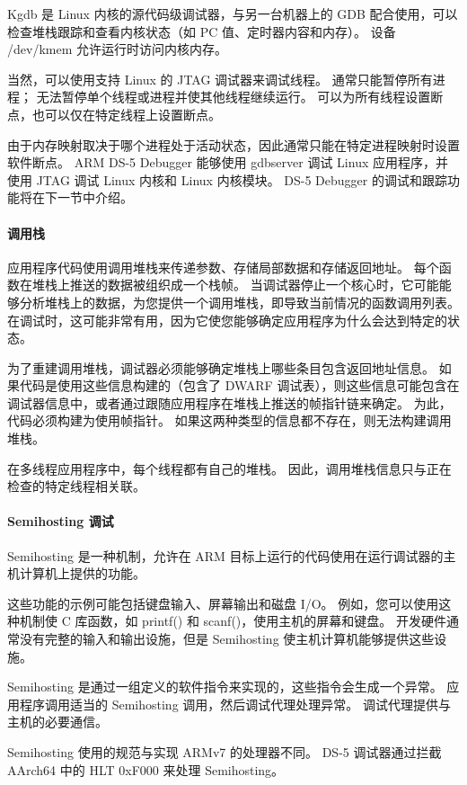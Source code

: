 Kgdb 是 Linux 内核的源代码级调试器，与另一台机器上的 GDB 配合使用，可以检查堆栈跟踪和查看内核状态（如 PC 值、定时器内容和内存）。
设备 /dev/kmem 允许运行时访问内核内存。

当然，可以使用支持 Linux 的 JTAG 调试器来调试线程。
通常只能暂停所有进程；
无法暂停单个线程或进程并使其他线程继续运行。
可以为所有线程设置断点，也可以仅在特定线程上设置断点。

由于内存映射取决于哪个进程处于活动状态，因此通常只能在特定进程映射时设置软件断点。
ARM DS-5 Debugger 能够使用 gdbserver 调试 Linux 应用程序，并使用 JTAG 调试 Linux 内核和 Linux 内核模块。
DS-5 Debugger 的调试和跟踪功能将在下一节中介绍。

\paragraph*{调用栈}

应用程序代码使用调用堆栈来传递参数、存储局部数据和存储返回地址。
每个函数在堆栈上推送的数据被组织成一个栈帧。
当调试器停止一个核心时，它可能能够分析堆栈上的数据，为您提供一个调用堆栈，即导致当前情况的函数调用列表。
在调试时，这可能非常有用，因为它使您能够确定应用程序为什么会达到特定的状态。

为了重建调用堆栈，调试器必须能够确定堆栈上哪些条目包含返回地址信息。
如果代码是使用这些信息构建的（包含了 DWARF 调试表），则这些信息可能包含在调试器信息中，或者通过跟随应用程序在堆栈上推送的帧指针链来确定。
为此，代码必须构建为使用帧指针。
如果这两种类型的信息都不存在，则无法构建调用堆栈。

在多线程应用程序中，每个线程都有自己的堆栈。
因此，调用堆栈信息只与正在检查的特定线程相关联。

\paragraph*{Semihosting 调试}

Semihosting 是一种机制，允许在 ARM 目标上运行的代码使用在运行调试器的主机计算机上提供的功能。

这些功能的示例可能包括键盘输入、屏幕输出和磁盘 I/O。
例如，您可以使用这种机制使 C 库函数，如 printf() 和 scanf()，使用主机的屏幕和键盘。
开发硬件通常没有完整的输入和输出设施，但是 Semihosting 使主机计算机能够提供这些设施。

Semihosting 是通过一组定义的软件指令来实现的，这些指令会生成一个异常。
应用程序调用适当的 Semihosting 调用，然后调试代理处理异常。
调试代理提供与主机的必要通信。

Semihosting 使用的规范与实现 ARMv7 的处理器不同。
DS-5 调试器通过拦截 AArch64 中的 HLT 0xF000 来处理 Semihosting。


